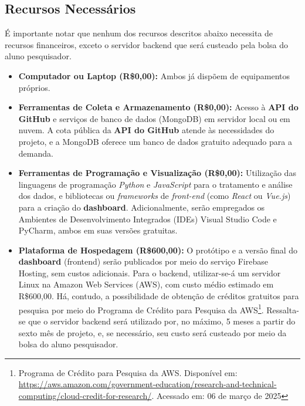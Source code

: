 \documentclass[
	12pt,           %
	openright,      %
	oneside,        %
	a4paper,        %
	brazil          %
]{abntex2}
\begin{document}
\subsection{Recursos Necessários}
É importante notar que nenhum dos recursos descritos abaixo necessita de recursos financeiros, exceto o servidor backend que será custeado pela bolsa do aluno pesquisador.
\begin{itemize}
    \item \textbf{Computador ou Laptop (R\$0,00):}  
    Ambos já dispõem de equipamentos próprios.
    \item \textbf{Ferramentas de Coleta e Armazenamento (R\$0,00):}  
    Acesso à \textbf{API do GitHub } e serviços de banco de dados (MongoDB) em servidor local ou em nuvem. A cota pública da \textbf{API do GitHub} atende às necessidades do projeto, e a MongoDB oferece um banco de dados gratuito adequado para a demanda.
    \item \textbf{Ferramentas de Programação e Visualização (R\$0,00):}  
    Utilização das linguagens de programação \textit{Python} e \textit{JavaScript} para o tratamento e análise dos dados, e bibliotecas ou \textit{frameworks} de \emph{front-end} (como \emph{React} ou \emph{Vue.js}) para a criação do \textbf{dashboard}. Adicionalmente, serão empregados os Ambientes de Desenvolvimento Integrados (IDEs) Visual Studio Code e PyCharm, ambos em suas versões gratuitas.
    \item \textbf{Plataforma de Hospedagem (R\$600,00):}
    O protótipo e a versão final do \textbf{dashboard} (frontend) serão publicados por meio do serviço Firebase Hosting, sem custos adicionais. Para o backend, utilizar-se-á um servidor Linux na Amazon Web Services (AWS), com custo médio estimado em R\$600,00. Há, contudo, a possibilidade de obtenção de créditos gratuitos para pesquisa por meio do Programa de Crédito para Pesquisa da AWS\footnote{Programa de Crédito para Pesquisa da AWS. Disponível em: \url{https://aws.amazon.com/government-education/research-and-technical-computing/cloud-credit-for-research/}. Acessado em: 06 de março de 2025}. Ressalta-se que o servidor backend será utilizado por, no máximo, 5 meses a partir do sexto mês de projeto, e, se necessário, seu custo será custeado por meio da bolsa do aluno pesquisador. 
\end{itemize}

\end{document}

